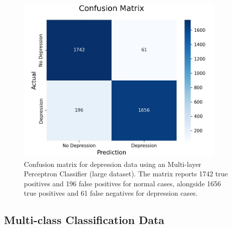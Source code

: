 \documentclass[runningheads,a4paper,11pt]{report}
\begin{document}
\begin{figure}[h]
\centering
\includegraphics[width=0.9\textwidth]{Depression-Data-MLPClassifier.jpg}
\caption[Confusion matrix for depression data ( Multi-layer Perceptron Classifier)]{Confusion matrix for depression data using an  Multi-layer Perceptron Classifier (large dataset). The matrix reports 1742 true positives and 196 false positives for normal cases, alongside 1656 true positives and 61 false negatives for depression cases.}
\end{figure}

\subsection{Multi-class Classification Data}
\label{section:multi-class-data}
\end{document}
